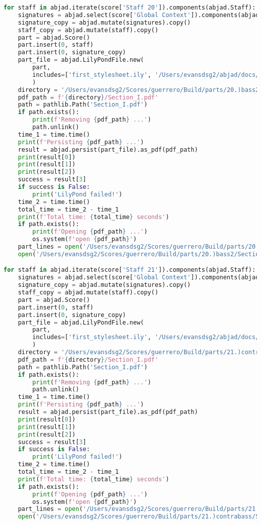 \begin{lstlisting}[language=Python, caption=Invocation Source Code]
for staff in abjad.iterate(score['Staff 20']).components(abjad.Staff):
    signatures = abjad.select(score['Global Context']).components(abjad.Staff)
    signature_copy = abjad.mutate(signatures).copy()
    staff_copy = abjad.mutate(staff).copy()
    part = abjad.Score()
    part.insert(0, staff)
    part.insert(0, signature_copy)
    part_file = abjad.LilyPondFile.new(
        part,
        includes=['first_stylesheet.ily', '/Users/evansdsg2/abjad/docs/source/_stylesheets/abjad.ily'],
        )
    directory = '/Users/evansdsg2/Scores/guerrero/Build/parts/20.)bass2'
    pdf_path = f'{directory}/Section_I.pdf'
    path = pathlib.Path('Section_I.pdf')
    if path.exists():
        print(f'Removing {pdf_path} ...')
        path.unlink()
    time_1 = time.time()
    print(f'Persisting {pdf_path} ...')
    result = abjad.persist(part_file).as_pdf(pdf_path)
    print(result[0])
    print(result[1])
    print(result[2])
    success = result[3]
    if success is False:
        print('LilyPond failed!')
    time_2 = time.time()
    total_time = time_2 - time_1
    print(f'Total time: {total_time} seconds')
    if path.exists():
        print(f'Opening {pdf_path} ...')
        os.system(f'open {pdf_path}')
    part_lines = open('/Users/evansdsg2/Scores/guerrero/Build/parts/20.)bass2/Section_I.ly').readlines()
    open('/Users/evansdsg2/Scores/guerrero/Build/parts/20.)bass2/Section_I.ly', 'w').writelines(part_lines[15:-1])

for staff in abjad.iterate(score['Staff 21']).components(abjad.Staff):
    signatures = abjad.select(score['Global Context']).components(abjad.Staff)
    signature_copy = abjad.mutate(signatures).copy()
    staff_copy = abjad.mutate(staff).copy()
    part = abjad.Score()
    part.insert(0, staff)
    part.insert(0, signature_copy)
    part_file = abjad.LilyPondFile.new(
        part,
        includes=['first_stylesheet.ily', '/Users/evansdsg2/abjad/docs/source/_stylesheets/abjad.ily'],
        )
    directory = '/Users/evansdsg2/Scores/guerrero/Build/parts/21.)contrabass'
    pdf_path = f'{directory}/Section_I.pdf'
    path = pathlib.Path('Section_I.pdf')
    if path.exists():
        print(f'Removing {pdf_path} ...')
        path.unlink()
    time_1 = time.time()
    print(f'Persisting {pdf_path} ...')
    result = abjad.persist(part_file).as_pdf(pdf_path)
    print(result[0])
    print(result[1])
    print(result[2])
    success = result[3]
    if success is False:
        print('LilyPond failed!')
    time_2 = time.time()
    total_time = time_2 - time_1
    print(f'Total time: {total_time} seconds')
    if path.exists():
        print(f'Opening {pdf_path} ...')
        os.system(f'open {pdf_path}')
    part_lines = open('/Users/evansdsg2/Scores/guerrero/Build/parts/21.)contrabass/Section_I.ly').readlines()
    open('/Users/evansdsg2/Scores/guerrero/Build/parts/21.)contrabass/Section_I.ly', 'w').writelines(part_lines[15:-1])
\end{lstlisting}
